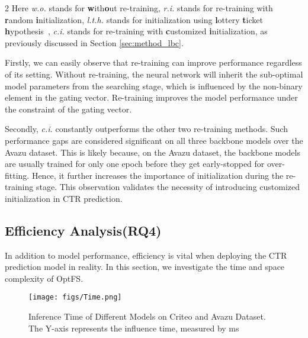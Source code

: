 \documentclass[sigconf]{acmart}
\begin{document}
\begin{table}[!htbp]
\begin{tablenotes}
\item[2] Here \textit{w.o.} stands for \textbf{w}ith\textbf{o}ut re-training, \textit{r.i.} stands for re-training with \textbf{r}andom \textbf{i}nitialization, \textit{l.t.h.} stands for initialization using \textbf{l}ottery \textbf{t}icket \textbf{h}ypothesis~\cite{LTH}, \textit{c.i.} stands for re-training with \textbf{c}ustomized \textbf{i}nitialization, as previously discussed in Section \ref{sec:method_lbc}.
\vspace{-10pt}
\end{tablenotes}
\end{table}

Firstly, we can easily observe that re-training can improve performance regardless of its setting. Without re-training, the neural network will inherit the sub-optimal model parameters from the searching stage, which is influenced by the non-binary element in the gating vector. Re-training improves the model performance under the constraint of the gating vector.

Secondly, \textit{c.i.} constantly outperforms the other two re-training methods. Such performance gaps are considered significant on all three backbone models over the Avazu dataset. This is likely because, on the Avazu dataset, the backbone models are usually trained for only one epoch before they get early-stopped for over-fitting. Hence, it further increases the importance of initialization during the re-training stage. This observation validates the necessity of introducing customized initialization in CTR prediction.

\subsection{Efficiency Analysis(RQ4)}

In addition to model performance, efficiency is vital when deploying the CTR prediction model in reality. In this section, we investigate the time and space complexity of OptFS.

\begin{figure}[!htbp]
    \centering
    \texttt{[image: figs/Time.png]}
    \vspace{-5pt}
    \caption{Inference Time of Different Models on Criteo and Avazu Dataset. The Y-axis represents the influence time, measured by ms}
    \vspace{-5pt}
    \label{fig:Time}
\end{figure}
\end{document}

